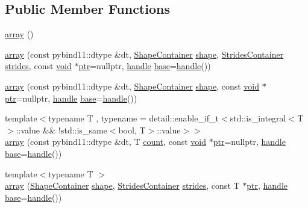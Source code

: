 \subsection*{Public Member Functions}
\begin{DoxyCompactItemize}
\item 
\mbox{\hyperlink{classarray_ac8a03ceadd605cd948be1aa66884b3a1}{array}} ()
\item 
\mbox{\hyperlink{classarray_a64167a4ca5cfd192b9957b6c2bf0b0d4}{array}} (const pybind11\+::dtype \&dt, \mbox{\hyperlink{classarray_a3378d7821106645fa3a88c5222e127e0}{Shape\+Container}} \mbox{\hyperlink{classarray_a084781a3d2cb3ea60ab7bcf16c30ee31}{shape}}, \mbox{\hyperlink{classarray_a8ba4f30946f0bc69ec937160c9fb10e1}{Strides\+Container}} \mbox{\hyperlink{_s_d_l__opengl__glext_8h_a0ee97b40d6208eba611c597d83b029a5}{strides}}, const \mbox{\hyperlink{_s_d_l__opengles2__gl2ext_8h_ae5d8fa23ad07c48bb609509eae494c95}{void}} $\ast$\mbox{\hyperlink{classhandle_afcd412ba4cbffd7d1e3c9338746b2682}{ptr}}=nullptr, \mbox{\hyperlink{classhandle}{handle}} \mbox{\hyperlink{structbase}{base}}=\mbox{\hyperlink{classhandle}{handle}}())
\item 
\mbox{\hyperlink{classarray_a07473e56f6f33ccb72eb184752dd3d5e}{array}} (const pybind11\+::dtype \&dt, \mbox{\hyperlink{classarray_a3378d7821106645fa3a88c5222e127e0}{Shape\+Container}} \mbox{\hyperlink{classarray_a084781a3d2cb3ea60ab7bcf16c30ee31}{shape}}, const \mbox{\hyperlink{_s_d_l__opengles2__gl2ext_8h_ae5d8fa23ad07c48bb609509eae494c95}{void}} $\ast$\mbox{\hyperlink{classhandle_afcd412ba4cbffd7d1e3c9338746b2682}{ptr}}=nullptr, \mbox{\hyperlink{classhandle}{handle}} \mbox{\hyperlink{structbase}{base}}=\mbox{\hyperlink{classhandle}{handle}}())
\item 
{\footnotesize template$<$typename T , typename  = detail\+::enable\+\_\+if\+\_\+t$<$std\+::is\+\_\+integral$<$\+T$>$\+::value \&\& !std\+::is\+\_\+same$<$bool, T$>$\+::value$>$$>$ }\\\mbox{\hyperlink{classarray_ab1734d05a763ee406ea70f0fbebb3cf4}{array}} (const pybind11\+::dtype \&dt, T \mbox{\hyperlink{_s_d_l__opengl_8h_a619bc20e8198de3bd3f3d7fc34de66b2}{count}}, const \mbox{\hyperlink{_s_d_l__opengles2__gl2ext_8h_ae5d8fa23ad07c48bb609509eae494c95}{void}} $\ast$\mbox{\hyperlink{classhandle_afcd412ba4cbffd7d1e3c9338746b2682}{ptr}}=nullptr, \mbox{\hyperlink{classhandle}{handle}} \mbox{\hyperlink{structbase}{base}}=\mbox{\hyperlink{classhandle}{handle}}())
\item 
{\footnotesize template$<$typename T $>$ }\\\mbox{\hyperlink{classarray_af12d5d4757512f405a734ab2fe235f26}{array}} (\mbox{\hyperlink{classarray_a3378d7821106645fa3a88c5222e127e0}{Shape\+Container}} \mbox{\hyperlink{classarray_a084781a3d2cb3ea60ab7bcf16c30ee31}{shape}}, \mbox{\hyperlink{classarray_a8ba4f30946f0bc69ec937160c9fb10e1}{Strides\+Container}} \mbox{\hyperlink{_s_d_l__opengl__glext_8h_a0ee97b40d6208eba611c597d83b029a5}{strides}}, const T $\ast$\mbox{\hyperlink{classhandle_afcd412ba4cbffd7d1e3c9338746b2682}{ptr}}, \mbox{\hyperlink{classhandle}{handle}} \mbox{\hyperlink{structbase}{base}}=\mbox{\hyperlink{classhandle}{handle}}())

\end{DoxyCompactItemize}
